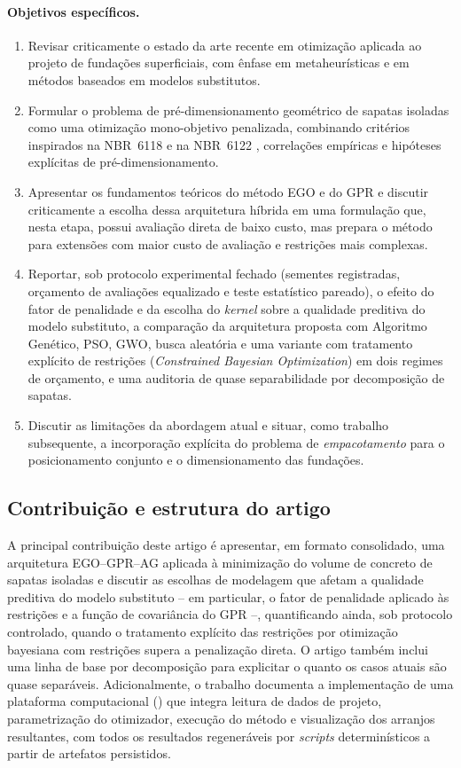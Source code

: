 \paragraph{Objetivos específicos.}
\begin{enumerate}
    \item Revisar criticamente o estado da arte recente em otimização aplicada ao projeto de fundações superficiais, com ênfase em metaheurísticas e em métodos baseados em modelos substitutos.
    \item Formular o problema de pré-dimensionamento geométrico de sapatas isoladas como uma otimização mono-objetivo penalizada, combinando critérios inspirados na NBR~6118  e na NBR~6122 , correlações empíricas e hipóteses explícitas de pré-dimensionamento.
    \item Apresentar os fundamentos teóricos do método EGO e do GPR e discutir criticamente a escolha dessa arquitetura híbrida em uma formulação que, nesta etapa, possui avaliação direta de baixo custo, mas prepara o método para extensões com maior custo de avaliação e restrições mais complexas.
    \item Reportar, sob protocolo experimental fechado (sementes registradas, orçamento de avaliações equalizado e teste estatístico pareado), o efeito do fator de penalidade e da escolha do \textit{kernel} sobre a qualidade preditiva do modelo substituto, a comparação da arquitetura proposta com Algoritmo Genético, PSO, GWO, busca aleatória e uma variante com tratamento explícito de restrições (\textit{Constrained Bayesian Optimization}) em dois regimes de orçamento, e uma auditoria de quase separabilidade por decomposição de sapatas.
    \item Discutir as limitações da abordagem atual e situar, como trabalho subsequente, a incorporação explícita do problema de \textit{empacotamento} para o posicionamento conjunto e o dimensionamento das fundações.
\end{enumerate}

\subsection{Contribuição e estrutura do artigo}
\label{sec:contribuicao}

A principal contribuição deste artigo é apresentar, em formato consolidado, uma arquitetura EGO--GPR--AG aplicada à minimização do volume de concreto de sapatas isoladas e discutir as escolhas de modelagem que afetam a qualidade preditiva do modelo substituto -- em particular, o fator de penalidade aplicado às restrições e a função de covariância do GPR --, quantificando ainda, sob protocolo controlado, quando o tratamento explícito das restrições por otimização bayesiana com restrições supera a penalização direta. O artigo também inclui uma linha de base por decomposição para explicitar o quanto os casos atuais são quase separáveis. Adicionalmente, o trabalho documenta a implementação de uma plataforma computacional (\fundaai{}) que integra leitura de dados de projeto, parametrização do otimizador, execução do método e visualização dos arranjos resultantes, com todos os resultados regeneráveis por \textit{scripts} determinísticos a partir de artefatos persistidos.

